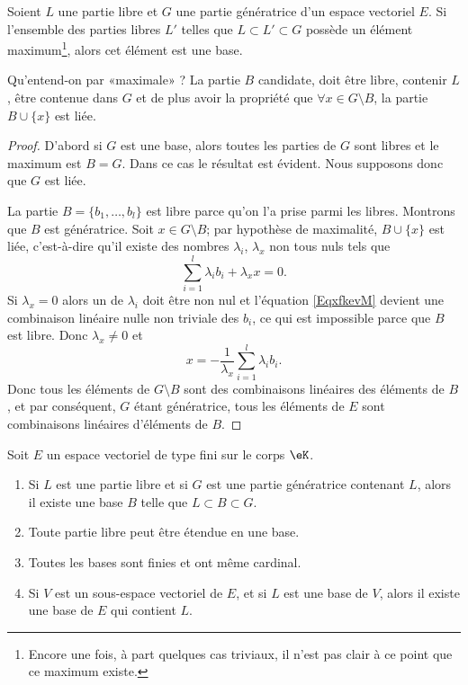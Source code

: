 \begin{lemma}   \label{LemkUfzHl}
	Soient \( L\) une partie libre et \( G\) une partie génératrice d'un espace vectoriel \( E\). Si l'ensemble des parties libres \( L'\) telles que \( L\subset L'\subset G\) possède un élément maximum\footnote{Encore une fois, à part quelques cas triviaux, il n'est pas clair à ce point que ce maximum existe.}, alors cet élément est une base.
\end{lemma}
Qu'entend-on par «maximale» ? La partie \( B\) candidate, doit être libre, contenir \( L\), être contenue dans \( G\) et de plus avoir la propriété que \( \forall x\in G\setminus B\), la partie \( B\cup\{ x \}\) est liée.

\begin{proof}
	D'abord si \( G\) est une base, alors toutes les parties de \( G\) sont libres et le maximum est \( B=G\). Dans ce cas le résultat est évident. Nous supposons donc que \( G\) est liée.

	La partie \( B=\{ b_1,\ldots, b_l \}\) est libre parce qu'on l'a prise parmi les libres. Montrons que \( B\) est génératrice. Soit \( x\in G\setminus B\); par hypothèse de maximalité, \( B\cup\{ x \}\) est liée, c'est-à-dire qu'il existe des nombres \( \lambda_i\), \( \lambda_x\) non tous nuls tels que
	\begin{equation}    \label{EqxfkevM}
		\sum_{i=1}^l\lambda_ib_i+\lambda_xx=0.
	\end{equation}
	Si \( \lambda_x=0\) alors un de \( \lambda_i\) doit être non nul et l'équation \eqref{EqxfkevM} devient une combinaison linéaire nulle non triviale des \( b_i\), ce qui est impossible parce que \( B\) est libre. Donc \( \lambda_x\neq 0\) et
	\begin{equation}
		x=-\frac{1}{ \lambda_x }\sum_{i=1}^l\lambda_ib_i.
	\end{equation}
	Donc tous les éléments de \( G\setminus B\) sont des combinaisons linéaires des éléments de \( B\), et par conséquent, \( G\) étant génératrice, tous les éléments de \( E\) sont combinaisons linéaires d'éléments de \( B\).
\end{proof}

\begin{theorem} \label{ThonmnWKs}
	Soit \( E\) un espace vectoriel de type fini sur le corps \( \eK\).
	\begin{enumerate}
		\item     \label{ItemBazxTZ}
		      Si \( L\) est une partie libre et si \( G\) est une partie génératrice contenant \( L\), alors il existe une base \( B\) telle que \( L\subset B\subset G\).
		\item     \label{ITEMooFVJXooGzzpOu}
		      Toute partie libre peut être étendue en une base.
		\item     \label{ITEMooFBUAooSSZxgx}
		      Toutes les bases sont finies et ont même cardinal.
		\item       \label{ITEMooJIJSooGuJMdt}
		      Si \( V\) est un sous-espace vectoriel de \( E\), et si \( L\) est une base de \( V\), alors il existe une base de \( E\) qui contient \( L\).
	\end{enumerate}
\end{theorem}

